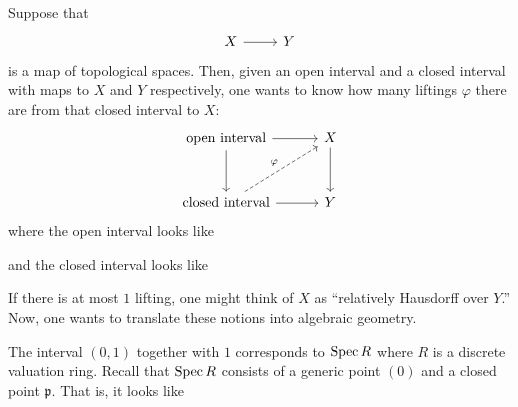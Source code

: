 \documentclass [11 pt, oneside] {article}
\begin{document}
Suppose that
\[
\begin{tikzcd}
X\ar[r]& Y
\end{tikzcd}
\] 
is a map of topological spaces. Then, given an open interval and a closed interval with maps to $X$ and $Y$ respectively, one wants to know how many liftings $\varphi$ there are from that closed interval to $X$:
\[
\begin{tikzcd}[column sep = 3 em, row sep = 3 em]
	\textrm{open interval} \ar[r]\ar[d] &X \ar[d]\\ \textrm{closed interval} \ar[r]\ar[ur,dashed,"\varphi"] &Y
\end{tikzcd}
\]
where the open interval looks like
\begin{center}
\end{center}
and the closed interval looks like
\begin{center}
\end{center}
If there is at most $1$ lifting, one might think of $X$ as ``relatively Hausdorff over $Y$.'' Now, one wants to translate these notions into algebraic geometry.

The interval $(0,1)$ together with $1$ corresponds to $\operatorname{Spec} R$ where $R$ is a discrete valuation ring. Recall that $\operatorname{Spec} R$ consists of a generic point $(0)$ and a closed point $\mathfrak{p}$. That is, it looks like
\begin{center}
\end{center}
\end{document}

